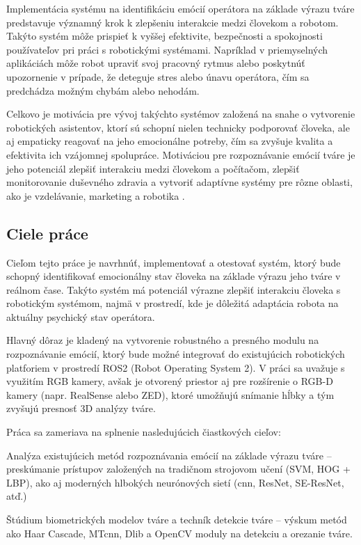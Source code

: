 Implementácia systému na identifikáciu emócií operátora na základe výrazu tváre predstavuje významný krok k zlepšeniu interakcie medzi človekom a robotom. Takýto systém môže prispieť k vyššej efektivite, 
bezpečnosti a spokojnosti používateľov pri práci s robotickými systémami. Napríklad v priemyselných aplikáciách môže robot upraviť svoj pracovný rytmus alebo poskytnúť upozornenie v prípade, 
že deteguje stres alebo únavu operátora, čím sa predchádza možným chybám alebo nehodám.​

Celkovo je motivácia pre vývoj takýchto systémov založená na snahe o vytvorenie robotických asistentov, ktorí sú schopní nielen technicky podporovať človeka, ale aj empaticky reagovať na jeho emocionálne potreby, čím sa zvyšuje kvalita a efektivita ich vzájomnej spolupráce.
Motiváciou pre rozpoznávanie emócií tváre je jeho potenciál zlepšiť interakciu medzi človekom a počítačom, zlepšiť monitorovanie duševného zdravia a vytvoriť adaptívne systémy pre rôzne oblasti, 
ako je vzdelávanie, marketing a robotika \cite{article01}.
\subsection{Ciele práce}
Cieľom tejto práce je navrhnúť, implementovať a otestovať systém, ktorý bude schopný identifikovať emocionálny stav človeka na základe výrazu jeho tváre v reálnom čase. Takýto systém má potenciál 
výrazne zlepšiť interakciu človeka s robotickým systémom, najmä v prostredí, kde je dôležitá adaptácia robota na aktuálny psychický stav operátora.

Hlavný dôraz je kladený na vytvorenie robustného a presného modulu na rozpoznávanie emócií, ktorý bude možné integrovať do existujúcich robotických platforiem v prostredí ROS2 (Robot Operating System 2). 
V práci sa uvažuje s využitím RGB kamery, avšak je otvorený priestor aj pre rozšírenie o RGB-D kamery (napr. RealSense alebo ZED), ktoré umožňujú snímanie hĺbky a tým zvyšujú presnosť 3D analýzy tváre.

Práca sa zameriava na splnenie nasledujúcich čiastkových cieľov:

Analýza existujúcich metód rozpoznávania emócií na základe výrazu tváre – preskúmanie prístupov založených na tradičnom strojovom učení (SVM, HOG + LBP), ako aj moderných hlbokých neurónových sietí 
(\gls{cnn}, ResNet, SE-ResNet, atď.)

Štúdium biometrických modelov tváre a techník detekcie tváre – výskum metód ako Haar Cascade, MT\gls{cnn}, Dlib a OpenCV moduly na detekciu a orezanie tváre.


